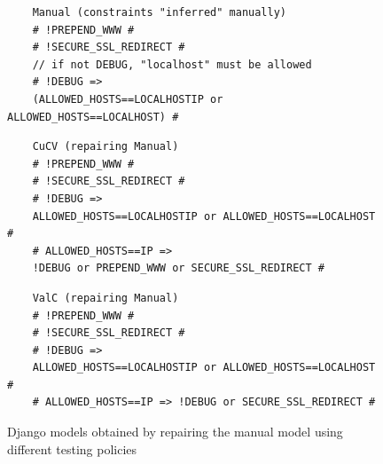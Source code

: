 \begin{tikzborder}{\cite{Gargantini16:validation}}
\begin{tikzborder}{\cite{gargantini_combinatorial_2017}}
\begin{figure}[h]

	\vspace{-3mm}
	\begin{lstlisting}
	Manual (constraints "inferred" manually)
	# !PREPEND_WWW #
	# !SECURE_SSL_REDIRECT #
	// if not DEBUG, "localhost" must be allowed
	# !DEBUG => 
	(ALLOWED_HOSTS==LOCALHOSTIP or ALLOWED_HOSTS==LOCALHOST) #
	\end{lstlisting}
	\vspace{-3mm}\begin{lstlisting}
	CuCV (repairing Manual)
	# !PREPEND_WWW #
	# !SECURE_SSL_REDIRECT #
	# !DEBUG => 
	ALLOWED_HOSTS==LOCALHOSTIP or ALLOWED_HOSTS==LOCALHOST #
	# ALLOWED_HOSTS==IP => 
	!DEBUG or PREPEND_WWW or SECURE_SSL_REDIRECT #
	\end{lstlisting}
	\vspace{-3mm}\begin{lstlisting}
	ValC (repairing Manual)
	# !PREPEND_WWW #
	# !SECURE_SSL_REDIRECT #
	# !DEBUG => 
	ALLOWED_HOSTS==LOCALHOSTIP or ALLOWED_HOSTS==LOCALHOST #
	# ALLOWED_HOSTS==IP => !DEBUG or SECURE_SSL_REDIRECT #
	\end{lstlisting}
	\caption{Django models obtained by repairing the manual model using different testing policies}\label{fig:djangofaults}	
	

\end{figure}
\end{tikzborder}
\end{tikzborder}
